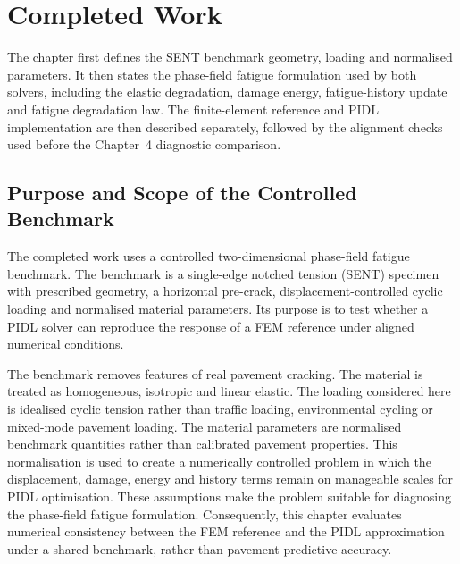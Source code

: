 
\ifpdf
    \graphicspath{{Chapter3/Figs/Raster/}{Chapter3/Figs/PDF/}{Chapter3/Figs/}}
\else
    \graphicspath{{Chapter3/Figs/Vector/}{Chapter3/Figs/}}
\fi

\chapter{Completed Work}
\label{ch:c3_pidl_formulation}



The chapter first defines the SENT benchmark geometry, loading and normalised parameters. It then states the phase-field fatigue formulation used by both solvers, including the elastic degradation, damage energy, fatigue-history update and fatigue degradation law. The finite-element reference and PIDL implementation are then described separately, followed by the alignment checks used before the Chapter~4 diagnostic comparison.

\section{Purpose and Scope of the Controlled Benchmark}
\label{sec:c3_scope}

The completed work uses a controlled two-dimensional phase-field fatigue benchmark. The benchmark is a single-edge notched tension (SENT) specimen with prescribed geometry, a horizontal pre-crack, displacement-controlled cyclic loading and normalised material parameters.  Its purpose is to test whether a PIDL solver can reproduce the response of a FEM reference under aligned numerical conditions.

The benchmark removes features of real pavement cracking. The material is treated as homogeneous, isotropic and linear elastic. The loading considered here is idealised cyclic tension rather than traffic loading, environmental cycling or mixed-mode pavement loading. The material parameters are normalised benchmark quantities rather than calibrated pavement properties. This normalisation is used to create a numerically controlled problem in which the displacement, damage, energy and history terms remain on manageable scales for PIDL optimisation. These assumptions make the problem suitable for diagnosing the phase-field fatigue formulation. Consequently, this chapter evaluates numerical consistency between the FEM reference and the PIDL approximation under a shared benchmark, rather than pavement predictive accuracy.

